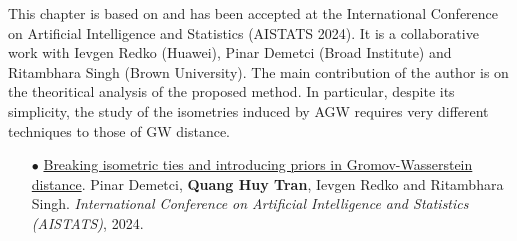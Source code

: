 This chapter is based on \citep{Demetci23} and has been accepted at the
International Conference on Artificial Intelligence and Statistics (AISTATS 2024).
It is a collaborative work with Ievgen Redko (Huawei), Pinar Demetci (Broad Institute)
and Ritambhara Singh (Brown University). The main contribution of the author is on the
theoritical analysis of the proposed method. In particular, despite its simplicity,
the study of the isometries induced by AGW requires very different techniques
to those of GW distance.

\begin{itemize}
    \item[$\bullet$] \ul{Breaking isometric ties and introducing priors in Gromov-Wasserstein distance}.
    Pinar Demetci, \textbf{Quang Huy Tran}, Ievgen Redko and Ritambhara Singh.
    \textit{International Conference on Artificial Intelligence and Statistics (AISTATS)}, 2024.
\end{itemize}